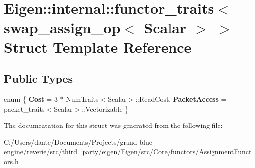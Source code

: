 \hypertarget{struct_eigen_1_1internal_1_1functor__traits_3_01swap__assign__op_3_01_scalar_01_4_01_4}{}\section{Eigen\+::internal\+::functor\+\_\+traits$<$ swap\+\_\+assign\+\_\+op$<$ Scalar $>$ $>$ Struct Template Reference}
\label{struct_eigen_1_1internal_1_1functor__traits_3_01swap__assign__op_3_01_scalar_01_4_01_4}
\subsection*{Public Types}
\begin{DoxyCompactItemize}
\item 
\mbox{\label{struct_eigen_1_1internal_1_1functor__traits_3_01swap__assign__op_3_01_scalar_01_4_01_4_ac815fe65229c565edbb8e0aac3db24d4}} 
enum \{ {\bfseries Cost} = 3 $\ast$ Num\+Traits$<$Scalar$>$\+::Read\+Cost, 
{\bfseries Packet\+Access} = packet\+\_\+traits$<$Scalar$>$\+::Vectorizable
 \}
\end{DoxyCompactItemize}


The documentation for this struct was generated from the following file\+:\begin{DoxyCompactItemize}
\item 
C\+:/\+Users/dante/\+Documents/\+Projects/grand-\/blue-\/engine/reverie/src/third\+\_\+party/eigen/\+Eigen/src/\+Core/functors/Assignment\+Functors.\+h\end{DoxyCompactItemize}
